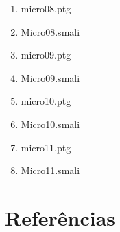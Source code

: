 \documentclass[12pt,a4paper,twoside]{report}
\begin{document}
\begin{enumerate}
\item micro08.ptg


\item Micro08.smali


\item micro09.ptg


\item Micro09.smali


\item micro10.ptg


\item Micro10.smali


\item micro11.ptg


\item Micro11.smali


\end{enumerate}

\chapter{Referências}


\clearpage
{}
\appendix
\end{document}

